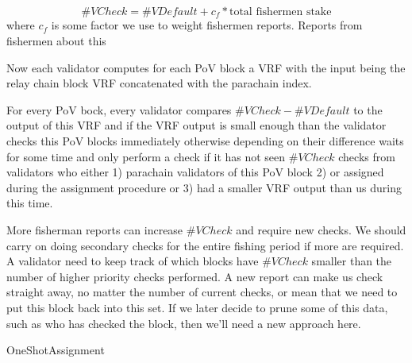 {$$\#VCheck = \#VDefault + c_f * \textrm{total fishermen stake}$$
where $c_f$ is some factor we use to weight fishermen reports. Reports from fishermen about this 

Now each validator computes for each PoV block a VRF with the input being the relay chain block VRF concatenated with the parachain index. 

For every PoV bock, every validator compares $\#VCheck - \#VDefault$ to the output of this VRF and if the VRF output is small enough than the validator checks this PoV blocks immediately otherwise depending on their difference waits for some time and only perform a check if it has not seen $\#VCheck$ checks from validators who either 1) parachain validators of this PoV block 2) or assigned during the assignment procedure or 3) had a smaller VRF output than us during this time.

More fisherman reports can increase $\#VCheck$ and require new checks. We should carry on doing secondary checks for the entire fishing period if more are required. A validator need to keep track of which blocks have $\#VCheck$ smaller than the number of higher priority checks performed. A new report can make us check straight away, no matter the number of current checks, or mean that we need to put this block back into this set. If we later decide to prune some of this data, such as who has checked the block, then we'll need a new approach here.

\begin{algorithm}
  \caption[]{\sc OneShotAssignment}
  \label{algo-extra-assignment}
  \begin{algorithmic}[1]
    \Require{}
    
    \State \TBS
  \end{algorithmic}
\end{algorithm}

}
